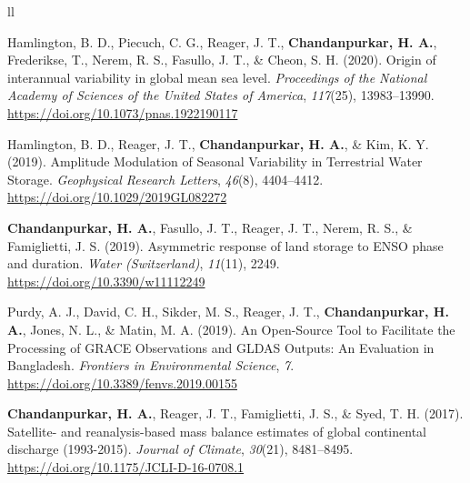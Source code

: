 ll\documentclass[10pt]{article}
\begin{document}
\label{csl:0}Hamlington, B. D., Piecuch, C. G., Reager, J. T., \textbf{Chandanpurkar, H. A.}, Frederikse, T., Nerem, R. S., Fasullo, J. T., \& Cheon, S. H. (2020). {Origin of interannual variability in global mean sea level}. \textit{Proceedings of the National Academy of Sciences of the United States of America}, \textit{117}(25), 13983–13990. \url{https://doi.org/10.1073/pnas.1922190117}

\label{csl:0}Hamlington, B. D., Reager, J. T., \textbf{Chandanpurkar, H. A.}, \& Kim, K. Y. (2019). {Amplitude Modulation of Seasonal Variability in Terrestrial Water Storage}. \textit{Geophysical Research Letters}, \textit{46}(8), 4404–4412. \url{https://doi.org/10.1029/2019GL082272}

\label{csl:0}\textbf{Chandanpurkar, H. A.}, Fasullo, J. T., Reager, J. T., Nerem, R. S., \& Famiglietti, J. S. (2019). {Asymmetric response of land storage to ENSO phase and duration}. \textit{Water (Switzerland)}, \textit{11}(11), 2249. \url{https://doi.org/10.3390/w11112249}

\label{csl:0}Purdy, A. J., David, C. H., Sikder, M. S., Reager, J. T., \textbf{Chandanpurkar, H. A.}, Jones, N. L., \& Matin, M. A. (2019). {An Open-Source Tool to Facilitate the Processing of GRACE Observations and GLDAS Outputs: An Evaluation in Bangladesh}. \textit{Frontiers in Environmental Science}, \textit{7}. \url{https://doi.org/10.3389/fenvs.2019.00155}

\label{csl:0}\textbf{Chandanpurkar, H. A.}, Reager, J. T., Famiglietti, J. S., \& Syed, T. H. (2017). {Satellite- and reanalysis-based mass balance estimates of global continental discharge (1993-2015)}. \textit{Journal of Climate}, \textit{30}(21), 8481–8495. \url{https://doi.org/10.1175/JCLI-D-16-0708.1}
\end{document}
